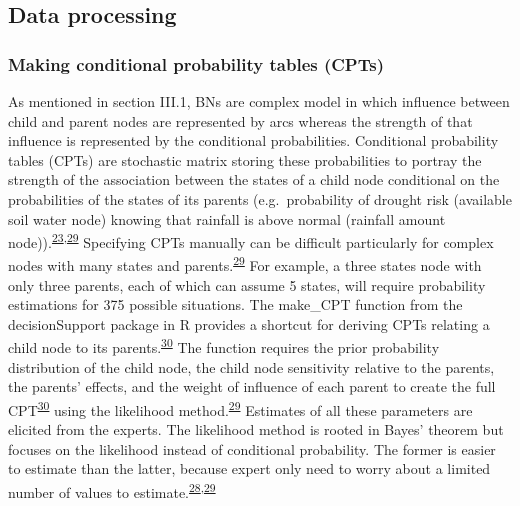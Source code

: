 \documentclass[11pt,preprint]{article}
\begin{document}
\hypertarget{data-processing}{%
\subsection{Data processing}\label{data-processing}}

\hypertarget{making-conditional-probability-tables-cpts}{%
\subsubsection{Making conditional probability tables
(CPTs)}\label{making-conditional-probability-tables-cpts}}

As mentioned in section III.1, BNs are complex model in which influence
between child and parent nodes are represented by arcs whereas the
strength of that influence is represented by the conditional
probabilities. Conditional probability tables (CPTs) are stochastic
matrix storing these probabilities to portray the strength of the
association between the states of a child node conditional on the
probabilities of the states of its parents (e.g.~probability of drought
risk (available soil water node) knowing that rainfall is above normal
(rainfall amount
node)).\textsuperscript{\protect\hyperlink{ref-Scutari_and_Denis_2015}{23},\protect\hyperlink{ref-Hansson_and_Sjokvist_2013}{29}}
Specifying CPTs manually can be difficult particularly for complex nodes
with many states and
parents.\textsuperscript{\protect\hyperlink{ref-Hansson_and_Sjokvist_2013}{29}}
For example, a three states node with only three parents, each of which
can assume 5 states, will require probability estimations for 375
possible situations. The make\_CPT function from the decisionSupport
package in R provides a shortcut for deriving CPTs relating a child node
to its
parents.\textsuperscript{\protect\hyperlink{ref-Luedeling_and_Goehring_2018}{30}}
The function requires the prior probability distribution of the child
node, the child node sensitivity relative to the parents, the parents'
effects, and the weight of influence of each parent to create the full
CPT\textsuperscript{\protect\hyperlink{ref-Luedeling_and_Goehring_2018}{30}}
using the likelihood
method.\textsuperscript{\protect\hyperlink{ref-Hansson_and_Sjokvist_2013}{29}}
Estimates of all these parameters are elicited from the experts. The
likelihood method is rooted in Bayes' theorem but focuses on the
likelihood instead of conditional probability. The former is easier to
estimate than the latter, because expert only need to worry about a
limited number of values to
estimate.\textsuperscript{\protect\hyperlink{ref-Whitney_et_al_2018a}{28},\protect\hyperlink{ref-Hansson_and_Sjokvist_2013}{29}}
\end{document}
